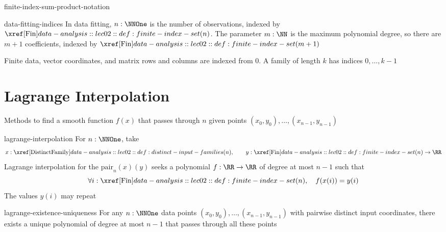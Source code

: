 \documentclass[12pt]{article}
\numberwithin{figure}{section}
\begin{document}
\begin{conv}{finite-index-sum-product-notation}
\end{conv}

\begin{conv}{data-fitting-indices}
  In data fitting, $n:\NNOne$ is the number of observations, indexed by
  $\Fin(n)$. The parameter $m:\NN$ is the maximum polynomial degree,
  so there are $m+1$ coefficients, indexed by $\Fin(m+1)$

  Finite data, vector coordinates, and matrix rows and columns are indexed
  from $0$. A family of length $k$ has indices $0,\ldots,k-1$
\end{conv}

\section{Lagrange Interpolation}

\begin{dfn}[Interpolation]
Methods to find a smooth function $f(x)$ that passes through $n$ given points $(x_0,y_0),\ldots,(x_{n-1},y_{n-1})$
\end{dfn} 

\begin{dfn}{lagrange-interpolation}
    For $n:\NNOne$, take
    \[
        x:\DistinctFamily(n),\qquad y:\Fin(n)\to\RR
    \]
    Lagrange interpolation for the
    $\mathrm{pair}_n(x)(y)$ seeks a polynomial $f:\RR\to\RR$
    of degree at most $n-1$ such that
    \[
        \forall i:\Fin(n),\quad f(x(i))=y(i)
    \]
    The values $y(i)$ may repeat
\end{dfn}

\begin{thm}{lagrange-existence-uniqueness}
For any $n:\NNOne$ data points $(x_0,y_0),\ldots,(x_{n-1},y_{n-1})$ with pairwise distinct input coordinates, there exists a unique polynomial of degree at most $n-1$ that passes through all these points
\end{thm} 
\end{document}
